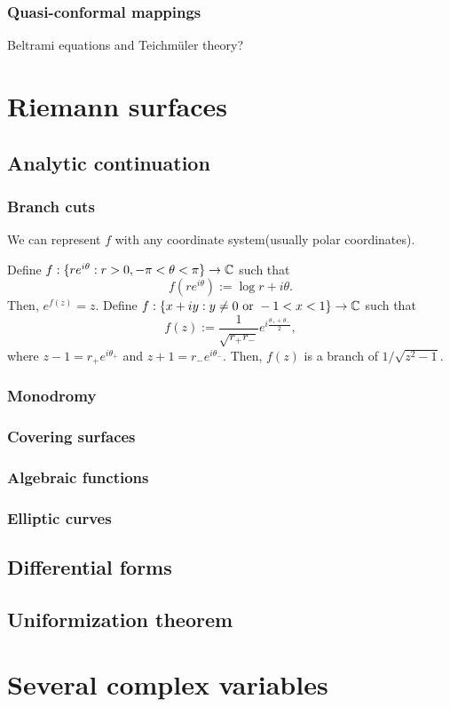 \documentclass{../note}
\begin{document}
\section{Quasi-conformal mappings}
Beltrami equations and Teichm\"uler theory?











\part{Riemann surfaces}

\chapter{Analytic continuation}
\section{Branch cuts}
We can represent $f$ with any coordinate system(usually polar coordinates).

Define $f:\{re^{i\theta}:r>0,-\pi<\theta<\pi\}\to\mathbb{C}$ such that
\[f(re^{i\theta}):=\log r+i\theta.\]
Then, $e^{f(z)}=z$.
Define $f:\{x+iy:y\ne0\text{ or }-1<x<1\}\to\mathbb{C}$ such that
\[f(z):=\frac1{\sqrt{r_+r_-}}e^{i\frac{\theta_++\theta_-}2},\]
where $z-1=r_+e^{i\theta_+}$ and $z+1=r_-e^{i\theta_-}$.
Then, $f(z)$ is a branch of $1/\sqrt{z^2-1}$.


\section{Monodromy}
\section{Covering surfaces}
\section{Algebraic functions}
\section{Elliptic curves}

\chapter{Differential forms}

\chapter{Uniformization theorem}




\part{Several complex variables}
\end{document}
